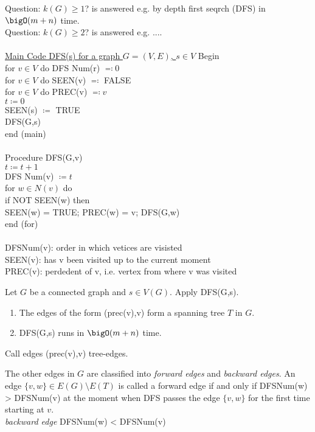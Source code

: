 \documentclass[aagt.tex]{subfiles}
\begin{document}
Question: $k(G) \geq 1$? is answered e.g. by depth first seqrch (DFS) in $\bigO(m+n)$ time.\\
Question: $k(G) \geq 2$? is answered e.g. ....\\
\\
\underline{Main Code DFS(s) for a graph $G=(V,E)$, $s \in V$}
Begin\\
  for $v \in V$ do DFS Num(r) $\eqqcolon 0$\\
  for $v \in V$ do SEEN(v) $\eqqcolon$ FALSE\\
  for $v \in V$ do PREC(v) $\eqqcolon v$\\
  $t \coloneqq 0$\\
  SEEN(s) $\coloneqq$ TRUE\\
  DFS(G,s)\\
end (main)\\
\\
Procedure DFS(G,v)\\
  $t \coloneqq t+1$\\
  DFS Num(v) $\coloneqq t$\\
  for $w \in N(v)$ do\\
    if NOT SEEN(w) then\\
      SEEN(w) = TRUE; PREC(w) = v; DFS(G,w)\\
  end (for)\\
\\
DFSNum(v): order in which vetices are visisted\\
SEEN(v): has v been visited up to the current moment\\
PREC(v): perdedent of v, i.e. vertex from where v was visited\\

\begin{prop}[2.8?]
  Let $G$ be a connected graph and $s \in V(G)$.
  Apply DFS(G,s). 
  \begin{enumerate}[label=(\alph*)]
    \item The edges of the form (prec(v),v) form a spanning tree $T$ in $G$.
    \item DFS(G,s) runs in $\bigO(m+n)$ time.
  \end{enumerate}
  Call edges (prec(v),v) tree-edges.
\end{prop}

The other edges in $G$ are classified into \emph{forward edges} and \emph{backward edges}.
An edge $\{v,w\} \in E(G) \setminus E(T)$ is called a forward edge if and only if DFSNum(w) > DFSNum(v) at the moment when DFS passes the edge $\{v,w\}$ for the first time starting at $v$.\\
\emph{backward edge} DFSNum(w) < DFSNum(v)
\end{document}
